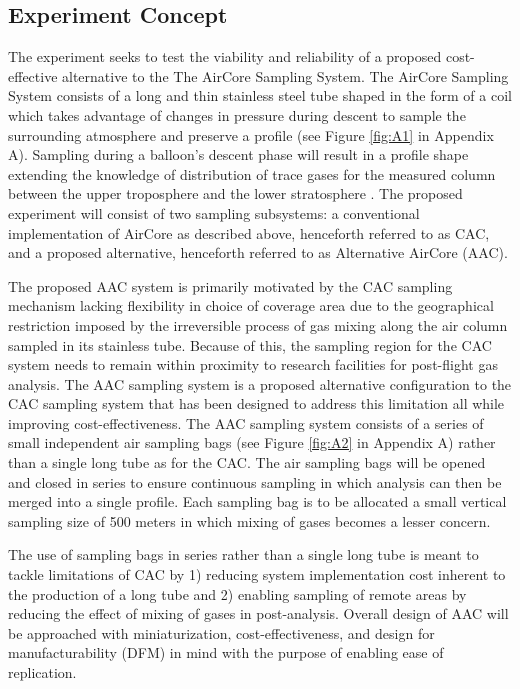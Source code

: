 \subsection{Experiment Concept}

The experiment seeks to test the viability and reliability of a proposed cost-effective alternative to the The AirCore Sampling System. The AirCore Sampling System consists of a long and thin stainless steel tube shaped in the form of a coil which takes advantage of changes in pressure during descent to sample the surrounding atmosphere and preserve a profile (see Figure \ref{fig:A1} in Appendix A). Sampling during a balloon’s descent phase will result in a profile shape extending the knowledge of distribution of trace gases for the measured column between the upper troposphere and the lower stratosphere \cite{Karion}. The proposed experiment will consist of two sampling subsystems: a conventional implementation of AirCore as described above, henceforth referred to as CAC, and a proposed alternative, henceforth referred to as Alternative AirCore (AAC).

The proposed AAC system is primarily motivated by the CAC sampling mechanism lacking flexibility in choice of coverage area due to the geographical restriction imposed by the irreversible process of gas mixing along the air column sampled in its stainless tube. Because of this, the sampling region for the CAC system needs to remain within proximity to research facilities for post-flight gas analysis. The AAC sampling system is a proposed alternative configuration to the CAC sampling system that has been designed to address this limitation all while improving cost-effectiveness. The AAC sampling system consists of a series of small independent air sampling bags (see Figure \ref{fig:A2} in Appendix A) rather than a single long tube as for the CAC. The air sampling bags will be opened and closed in series to ensure continuous sampling in which analysis can then be merged into a single profile. Each sampling bag is to be allocated a small vertical sampling size of 500 meters in which mixing of gases becomes a lesser concern.

The use of sampling bags in series rather than a single long tube is meant to tackle limitations of CAC by 1) reducing system implementation cost inherent to the production of a long tube and 2) enabling sampling of remote areas by reducing the effect of mixing of gases in post-analysis. Overall design of AAC will be approached with miniaturization, cost-effectiveness, and design for manufacturability (DFM) in mind with the purpose of enabling ease of replication.